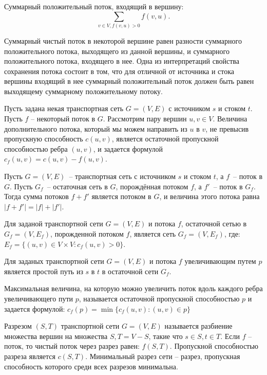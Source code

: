 \documentclass[a4paper,14pt]{article}
\begin{document}
    \begin{Def}
        Суммарный положительный поток, входящий в вершину:
        \[
        \sum\limits_{v\in V, f(v,u) > 0} f(v, u).
        \]
    \end{Def}
    \begin{Def}
        Суммарный чистый поток в некоторой вершине равен разности
суммарного положительного потока, выходящего из данной
вершины, и суммарного положительного потока, входящего в нее.
Одна из интерпретаций свойства сохранения потока состоит в том,
что для отличной от источника и стока вершины входящий в нее
суммарный положительный поток должен быть равен выходящему
суммарному положительному потоку.
    \end{Def}
    \begin{Def}
        Пусть задана некая транспортная сеть $G = (V,E)$ с источником $s$ и
стоком $t$. Пусть $f$ – некоторый поток в $G$. Рассмотрим пару вершин
$u,v \in V$. Величина дополнительного потока, который мы можем
направить из $u$ в $v$, не превысив пропускную способность $c(u,v)$,
является остаточной пропускной способностью ребра $(u,v)$, и
задается формулой $c_f(u,v) = c(u,v)-f(u,v)$.
    \end{Def}

    \begin{lemma}
        Пусть $G = (V, E)$~-- транспортная сеть с источником $s$ и стоком $t$, а $f$~-- поток в $G$. Пусть $G_f$~-- остаточная сеть в $G$, порождённая потоком $f$, а $f'$~-- поток в $G_f$. Тогда сумма потоков $f + f'$ является потоком в $G$, и величина этого потока равна $|f + f'| = |f| + |f'|$.
    \end{lemma}
    \begin{Def}
        Для заданой транспортной сети $G = (V,E)$ и потока $f$, остаточной
        сетью в $G_f = (V,E_f)$, порожденной потоком $f$, является сеть $G_f = (V,E_f)$, где:
        $E_f = \{(u,v) \in V \times V : c_f(u,v) > 0\}$.
    \end{Def}
    \begin{Def}
        Для заданых транспортной сети $G = (V,E)$ и потока $f$ увеличивающим путем $p$ является простой путь из $s$ в $t$ в
остаточной сети $G_f$.
    \end{Def}
    \begin{Def}
        Максимальная величина, на которую можно увеличить поток вдоль
        каждого ребра увеличивающего пути $p$, называется остаточной
        пропускной способностью $p$ и задается формулой:
        $c_f(p) = \min\{c_f(u,v) : (u,v) \in p\}$
    \end{Def}
    \begin{Def}
        Разрезом $(S,T)$ транспортной сети $G = (V,E)$ называется разбиение
        множества вершин на множества $S,T = V-S$, такие что
        $s  \in S,t \in T$. Если $f$ – поток, то чистый поток через разрез равен:
        $f(S,T)$. Пропускной способностью разреза является $c(S,T)$.
        Минимальный разрез сети – разрез, пропускная способность
        которого среди всех разрезов минимальна.
    \end{Def}
\end{document}
